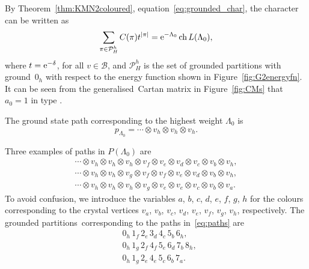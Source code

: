 \documentclass[pdftex]{sigma}
\numberwithin{equation}{section}
\theoremstyle{definition}
\begin{document}
By Theorem~\ref{thm:KMN2coloured}, equation~\eqref{eq:grounded_char},
the character can be written as
\begin{align*}
\sum_{\pi \in \mathcal{P}_H^{h}} C(\pi) t^{|\pi|} = {\rm e}^{-\Lambda_0} \operatorname{ch} L(\Lambda_0),
\end{align*}
where $t = {\rm e}^{-\delta}$,  for all $v \in \mathcal{B}$, and $\mathcal{P}_H^{h}$ is the set of grounded partitions with ground~$0_{h}$ with respect to the energy function shown in Figure~\ref{fig:G2energyfn}. It can be seen from the generalised~Cartan matrix in Figure~\ref{fig:CMs} that $a_0=1$ in type .

The ground state path corresponding to the highest weight $\Lambda_0$ is
\[
p_{\Lambda_0}=\cdots\otimes v_h\otimes v_h\otimes v_h.
\]

Three examples of paths in $P(\Lambda_0)$ are
\begin{equation}\label{eq:paths}
\begin{gathered}
\cdots\otimes v_h\otimes v_h\otimes v_h\otimes v_f\otimes v_e\otimes v_d\otimes v_c\otimes v_b\otimes v_h,\\
\cdots\otimes v_h\otimes v_h\otimes v_g\otimes v_f\otimes v_f\otimes v_e\otimes v_d\otimes v_b\otimes v_h,\\
\cdots\otimes v_h\otimes v_h\otimes v_h\otimes v_g\otimes v_e\otimes v_e\otimes v_c\otimes v_b\otimes v_a.
\end{gathered}
\end{equation}
To avoid confusion, we introduce the variables $a$, $b$, $c$, $d$, $e$, $f$, $g$, $h$ for the colours corresponding to the crystal vertices $v_a$, $v_b$, $v_c$, $v_d$, $v_e$, $v_f$, $v_g$, $v_h$, respectively. The grounded partitions~corresponding to the paths in~\eqref{eq:paths} are
\begin{align*}
&0_h\,1_f\,2_e\,3_d\,4_c\,5_b\,6_h,\\
&0_h\,1_g\,2_f\,4_f\,5_e\,6_d\,7_b\,8_h,\\
&0_h\,1_g\,2_e\,4_e\,5_c\,6_b\,7_a.
\end{align*}
\end{document}
